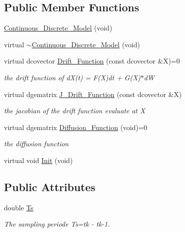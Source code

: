 \subsection*{Public Member Functions}
\begin{CompactItemize}
\item 
\hyperlink{class_continuous___discrete___model_fb738151cc4eb952d278d5531d10f97d}{Continuous\_\-Discrete\_\-Model} (void)
\item 
virtual \hyperlink{class_continuous___discrete___model_7c1ca102575a59207c3662181be1bdea}{$\sim$Continuous\_\-Discrete\_\-Model} (void)
\item 
virtual dcovector \hyperlink{class_continuous___discrete___model_fb901d0d92470ee3e2f5a06f74336b7d}{Drift\_\-Function} (const dcovector \&X)=0
\begin{CompactList}\small\item\em the drift function of dX(t) = F(X)dt + G(X)$\ast$dW \item\end{CompactList}\item 
virtual dgematrix \hyperlink{class_continuous___discrete___model_634d515a19cc782505935c8f23b00fff}{J\_\-Drift\_\-Function} (const dcovector \&X)
\begin{CompactList}\small\item\em the jacobian of the drift function evaluate at X \item\end{CompactList}\item 
virtual dgematrix \hyperlink{class_continuous___discrete___model_e305ba43f31be1275ede8d3d48d1d779}{Diffusion\_\-Function} (void)=0
\begin{CompactList}\small\item\em the diffusion function \item\end{CompactList}\item 
virtual void \hyperlink{class_continuous___discrete___model_fb787d768352c5a38048c35e51e7735d}{Init} (void)
\end{CompactItemize}
\subsection*{Public Attributes}
\begin{CompactItemize}
\item 
double \hyperlink{class_continuous___discrete___model_060335cf774016bc41c12a1c8421628c}{Ts}
\begin{CompactList}\small\item\em The sampling periode Ts=tk - tk-1. \item\end{CompactList}\end{CompactItemize}


